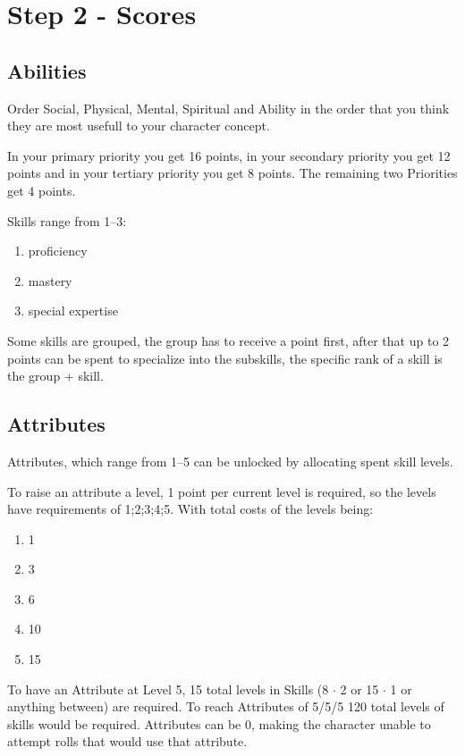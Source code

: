 \documentclass[a4paper]{book}
\begin{document}
    \section{Step 2 - Scores}\label{sec:step2-scores}
    \subsection{Abilities}\label{subsec:abilities}
    Order Social, Physical, Mental, Spiritual and Ability in the order that you think they are most
    usefull to your character concept. \par
    In your primary priority you get 16 points, in your secondary priority you get 12 points and in your tertiary
    priority you get 8 points.
    The remaining two Priorities get 4 points.\par
    Skills range from 1--3:
    \begin{enumerate}
        \item proficiency
        \item mastery
        \item special expertise
    \end{enumerate}
    Some skills are grouped, the group has to receive a point first, after that up to 2 points can be spent to
    specialize into the subskills, the specific rank of a skill is the group + skill.

    \subsection{Attributes}\label{subsec:attributes}
    Attributes, which range from 1--5 can be unlocked by allocating spent skill levels.\par
    To raise an attribute a level, 1 point per current level is required, so the levels have requirements of 1;2;3;4;5.
    With total costs of the levels being:\par
    \begin{enumerate}
        \item 1
        \item 3
        \item 6
        \item 10
        \item 15
    \end{enumerate}
    To have an Attribute at Level 5, 15 total levels in Skills (8 $\cdot$ 2 or 15 $\cdot$ 1 or anything between) are
    required.
    To reach Attributes of 5/5/5 120 total levels of skills would be required.
    Attributes can be 0, making the character unable to attempt rolls that would use that attribute.
\end{document}
